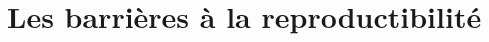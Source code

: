 \documentclass[aspectratio=169,10pt,xcolor=x11names,english,french]{beamer}
\begin{document}
	\section{Les barrières à la reproductibilité}
	
\end{document}
